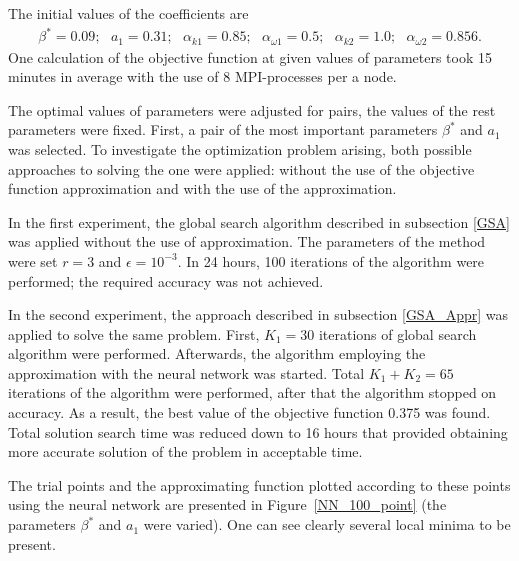 \documentclass[applsci,article,submit,moreauthors,pdftex]{Definitions/mdpi}
\begin{document}
The initial values of the coefficients are
\begin{equation}
	\begin{aligned}
		\beta^* = 0.09;\ \ \ a_1 = 0.31;\ \ \ \alpha_{k 1} = 0.85;\ \ \ \alpha_{\omega 1} = 0.5; \ \ \ \alpha_{k 2} = 1.0;\ \ \ \alpha_{\omega 2} = 0.856.
	\end{aligned}
\end{equation}
One calculation of the objective function at given values of parameters took 15 minutes in average with the use of 8 MPI-processes per a node. 

The optimal values of parameters were adjusted for pairs, the values of the rest parameters were fixed. 
First, a pair of the most important parameters $\beta^*$ and $a_1$ was selected. 
To investigate the optimization problem arising, both possible approaches to solving the one were applied: without the use of the objective function approximation  and with the use of the approximation.

In the first experiment, the global search algorithm described in subsection \ref{GSA} was applied without the use of approximation. 
The parameters of the method were set $r = 3$ and $\epsilon = 10^{-3}$. 
In 24 hours, 100 iterations of the algorithm were performed; the required accuracy was not achieved. 

In the second experiment, the approach described in subsection \ref{GSA_Appr} was applied to solve the same problem.
First, $K_1 = 30$ iterations of global search algorithm were performed. 
Afterwards, the algorithm employing the approximation with the neural network was started. 
Total $K_1 + K_2 = 65$ iterations of the algorithm were performed, after that the algorithm stopped on accuracy. 
As a result, the best value  of the objective function 0.375 was found. 
Total solution search time was reduced down to 16 hours that provided obtaining more accurate solution of the problem in acceptable time.

The trial points and the approximating function plotted according to these points using the neural network are presented in Figure~\ref{NN_100_point} (the parameters $\beta^*$ and $a_1$ were varied). One can see clearly several local minima to be present.
\end{document}
